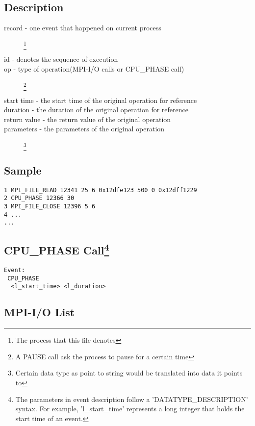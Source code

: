 \documentclass{article}
\begin{document}
\subsection{Description}
\label{sec:Description}
\begin{description}
\item[record - one event that happened on current process]\footnote{The process that this file denotes}
\item[id - denotes the sequence of execution]
\item[op - type of operation(MPI-I/O calls or CPU\_PHASE call)]\footnote{A PAUSE call ask the process to pause for a certain time}
\item[start time - the start time of the original operation for reference]
\item[duration - the duration of the original operation for reference]
\item[return value - the return value of the original operation]
\item[parameters - the parameters of the original operation]\footnote{Certain data type as point to string would be translated into data it points to}
\end{description}

\subsection{Sample}
\label{sec:SampleMPI}
\begin{verbatim}
1 MPI_FILE_READ 12341 25 6 0x12dfe123 500 0 0x12dff1229
2 CPU_PHASE 12366 30
3 MPI_FILE_CLOSE 12396 5 6
4 ...
...
\end{verbatim}

\subsection[CPU\_PHASE Call]{CPU\_PHASE Call\footnote{The parameters in event description follow a 'DATATYPE\_DESCRIPTION' syntax. For example, 'l\_start\_time' represents a long integer that holds the start time of an event.}}
\label{sec:CPUPHASECall}
\begin{verbatim}
Event:
 CPU_PHASE 
  <l_start_time> <l_duration>
\end{verbatim}

\subsection{MPI-I/O List}
\label{sec:MPIIOList}
\end{document}
